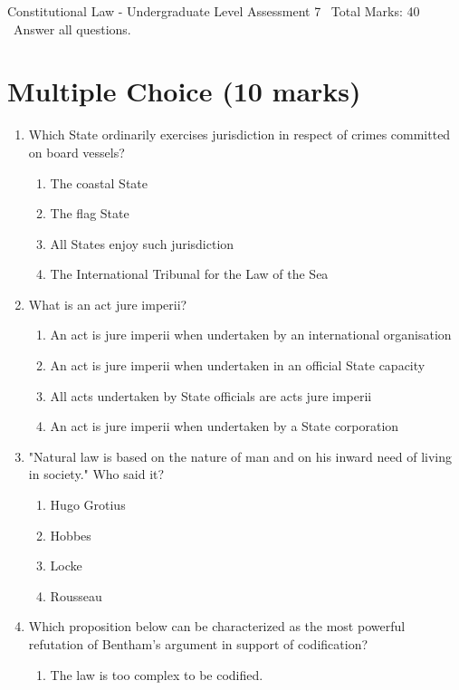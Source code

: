 \documentclass[12pt]{article}
\begin{document}
\begin{center}
Constitutional Law - Undergraduate Level Assessment 7 \
Total Marks: 40 \
Answer all questions.
\end{center}

\section*{Multiple Choice (10 marks)}
\begin{enumerate}[label=\arabic*.]
\item Which State ordinarily exercises jurisdiction in respect of crimes committed on board vessels?
\begin{enumerate}[label=(\alph*)]
    \item The coastal State
    \item The flag State
    \item All States enjoy such jurisdiction
    \item The International Tribunal for the Law of the Sea
\end{enumerate}
\item What is an act jure imperii?
\begin{enumerate}[label=(\alph*)]
    \item An act is jure imperii when undertaken by an international organisation
    \item An act is jure imperii when undertaken in an official State capacity
    \item All acts undertaken by State officials are acts jure imperii
    \item An act is jure imperii when undertaken by a State corporation
\end{enumerate}
\item "Natural law is based on the nature of man and on his inward need of living in society." Who said it?
\begin{enumerate}[label=(\alph*)]
    \item Hugo Grotius
    \item Hobbes
    \item Locke
    \item Rousseau
\end{enumerate}
\item Which proposition below can be characterized as the most powerful refutation of Bentham's argument in support of codification?
\begin{enumerate}[label=(\alph*)]
    \item The law is too complex to be codified.

\end{enumerate}
\end{enumerate}
\end{document}
